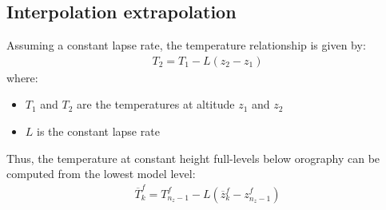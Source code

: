 \documentclass[12pt]{scrartcl}
\begin{document}
\subsection{Interpolation extrapolation}

Assuming a constant lapse rate, the temperature relationship is given by:
\begin{align}
T_2 = T_1-L \left(z_2-z_1\right)
\end{align}
where:
\begin{itemize}
\item $T_1$ and $T_2$ are the temperatures at altitude $z_1$ and $z_2$
\item $L$ is the constant lapse rate
\end{itemize}

Thus, the temperature at constant height full-levels below orography can be computed from the lowest model level:
\begin{align}
\overline{T}^f_k = T^f_{n_z-1} - L \left(\overline{z}^f_k - z^f_{n_z-1}\right)
\end{align}

%
%
\end{document}
